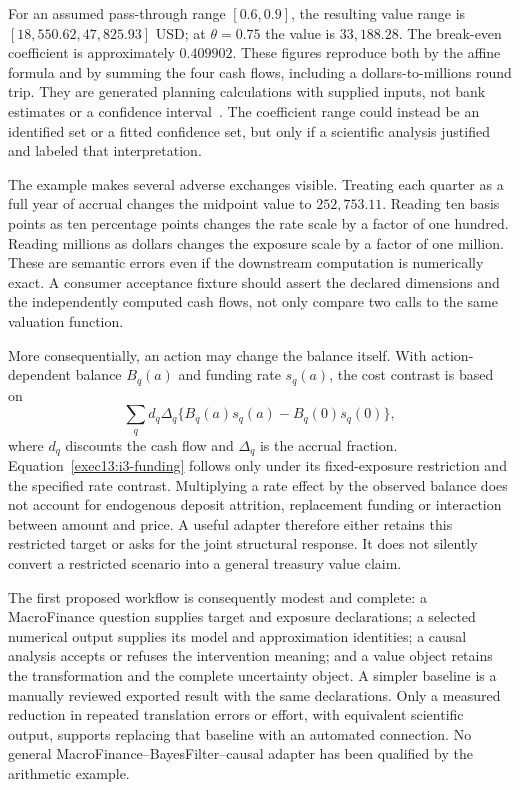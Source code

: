 For an assumed pass-through range $[0.6,0.9]$, the resulting value range is
$[18{,}550.62,47{,}825.93]$ USD; at $\theta=0.75$ the value is
$33{,}188.28$. The break-even coefficient is approximately $0.409902$.
These figures reproduce both by the affine formula and by summing the four
cash flows, including a dollars-to-millions round trip. They are generated
planning calculations with supplied inputs, not bank estimates or a
confidence interval~\citep{exec13_i3_examples}. The coefficient range could
instead be an identified set or a fitted confidence set, but only if a
scientific analysis justified and labeled that interpretation.

The example makes several adverse exchanges visible. Treating each quarter
as a full year of accrual changes the midpoint value to $252{,}753.11$.
Reading ten basis points as ten percentage points changes the rate scale by
a factor of one hundred. Reading millions as dollars changes the exposure
scale by a factor of one million. These are semantic errors even if the
downstream computation is numerically exact. A consumer acceptance fixture
should assert the declared dimensions and the independently computed cash
flows, not only compare two calls to the same valuation function.

More consequentially, an action may change the balance itself. With
action-dependent balance $B_q(a)$ and funding rate $s_q(a)$, the cost
contrast is based on
\[
 \sum_q d_q\Delta_q
       \{B_q(a)s_q(a)-B_q(0)s_q(0)\},
\]
where $d_q$ discounts the cash flow and $\Delta_q$ is the accrual fraction.
Equation~\eqref{exec13:i3-funding} follows only under its fixed-exposure
restriction and the specified rate contrast. Multiplying a rate effect by
the observed balance does not account for endogenous deposit attrition,
replacement funding or interaction between amount and price. A useful
adapter therefore either retains this restricted target or asks for the
joint structural response. It does not silently convert a restricted
scenario into a general treasury value claim.

The first proposed workflow is consequently modest and complete: a
MacroFinance question supplies target and exposure declarations; a selected
numerical output supplies its model and approximation identities; a causal
analysis accepts or refuses the intervention meaning; and a value object
retains the transformation and the complete uncertainty object. A simpler
baseline is a manually reviewed exported result with the same declarations.
Only a measured reduction in repeated translation errors or effort, with
equivalent scientific output, supports replacing that baseline with an
automated connection. No general MacroFinance--BayesFilter--causal adapter
has been qualified by the arithmetic example.

